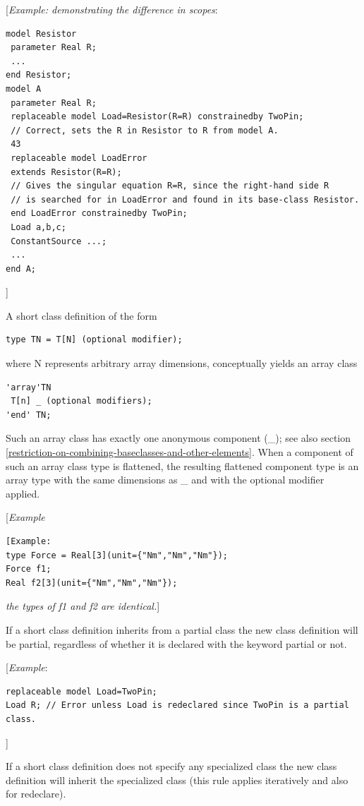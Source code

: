 \documentclass[10pt,a4paper]{report}
\def\Mcommentbegin#1{{[}\emph{#1}}
\def\Mcommentend#1{\emph{#1}{]}}
\begin{document}
\Mcommentbegin{Example: demonstrating the difference in scopes}:
\begin{lstlisting}[language=modelica]
model Resistor
 parameter Real R;
 ...
end Resistor;
model A
 parameter Real R;
 replaceable model Load=Resistor(R=R) constrainedby TwoPin;
 // Correct, sets the R in Resistor to R from model A.
 43
 replaceable model LoadError
 extends Resistor(R=R);
 // Gives the singular equation R=R, since the right-hand side R
 // is searched for in LoadError and found in its base-class Resistor.
 end LoadError constrainedby TwoPin;
 Load a,b,c;
 ConstantSource ...;
 ...
end A;
\end{lstlisting}
\Mcommentend{}

A short class definition of the form
\begin{lstlisting}[language=modelica]
type TN = T[N] (optional modifier);
\end{lstlisting}

where N represents arbitrary array dimensions, conceptually yields an
array class
\begin{lstlisting}[language=modelica]
'array'TN
 T[n] _ (optional modifiers);
'end' TN;
\end{lstlisting}

Such an array class has exactly one anonymous component (\_); see also
section \ref{restriction-on-combining-baseclasses-and-other-elements}. When a component of such an array class type is
flattened, the resulting flattened component type is an array type with
the same dimensions as \_ and with the optional modifier applied.

\Mcommentbegin{Example}
\begin{lstlisting}[language=modelica]
[Example:
type Force = Real[3](unit={"Nm","Nm","Nm"});
Force f1;
Real f2[3](unit={"Nm","Nm","Nm"});
\end{lstlisting}

\Mcommentend{the types of \emph{f1} and \emph{f2} are identical.}

If a short class definition inherits from a partial class the new class
definition will be partial, regardless of whether it is declared with
the keyword partial or not.

\Mcommentbegin{Example}:
\begin{lstlisting}[language=modelica]
replaceable model Load=TwoPin;
Load R; // Error unless Load is redeclared since TwoPin is a partial class.
\end{lstlisting}
\Mcommentend{}

If a short class definition does not specify any specialized class the
new class definition will inherit the specialized class (this rule
applies iteratively and also for redeclare).
\end{document}
